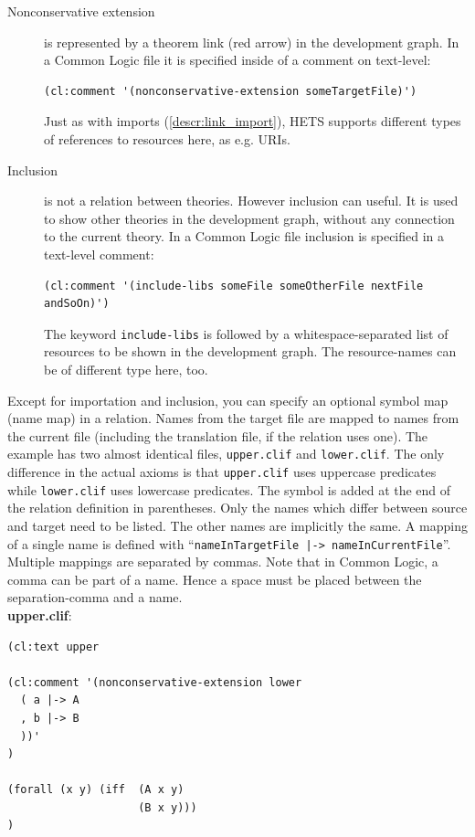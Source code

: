 \documentclass{article}
\newcommand{\normalTEXTSC}[2]{{#1\scriptsize#2}}
\newcommand     {\Hets}{\normalTEXTSC{H}{ETS}\xspace}
\begin{document}
\begin{description}
\item[Nonconservative extension]
  is represented by a theorem link (red arrow) in the development graph. In a 
  Common Logic file it is specified inside of a comment on text-level:
  
  \begin{lstlisting}[language=clif]
(cl:comment '(nonconservative-extension someTargetFile)')
  \end{lstlisting}
  Just as with imports (\ref{descr:link_import}), \Hets supports different types 
  of references to resources here, as e.g. URIs.
  

\item[Inclusion]
  is not a relation between theories. However inclusion can useful. It is used 
  to show other theories in the development graph, without any connection 
  to the current theory. In a Common Logic file inclusion is specified in a 
  text-level comment:
  \begin{lstlisting}[language=clif]
(cl:comment '(include-libs someFile someOtherFile nextFile andSoOn)')
  \end{lstlisting}
  The keyword \texttt{include-libs} is followed by a whitespace-separated list 
  of resources to be shown in the development graph. The resource-names can be 
  of different type here, too.
\end{description}

Except for importation and inclusion, you can specify an optional symbol map 
(name map) in a relation. Names from the target file are mapped to names from the current 
file (including the translation file, if the relation uses one). 
The example has two almost identical files, \texttt{upper.clif} and 
\texttt{lower.clif}. The only difference in the actual axioms is that 
\texttt{upper.clif} uses uppercase predicates while \texttt{lower.clif} 
uses lowercase predicates. The symbol is added at the end of the relation
definition in parentheses. Only the names which differ between source
and target need to be listed. The other names are implicitly the same. 
A mapping of a single name is defined with 
``\texttt{nameInTargetFile |-> nameInCurrentFile}''. Multiple mappings are 
separated by commas. Note that in Common Logic, a comma can be part of a name.
Hence a space must be placed between the separation-comma and a name.\\

\textbf{upper.clif}:
\begin{lstlisting}[language=clif]
(cl:text upper

(cl:comment '(nonconservative-extension lower
  ( a |-> A
  , b |-> B
  ))'
)

(forall (x y) (iff  (A x y)
                    (B x y)))
)
\end{lstlisting}
\end{document}
